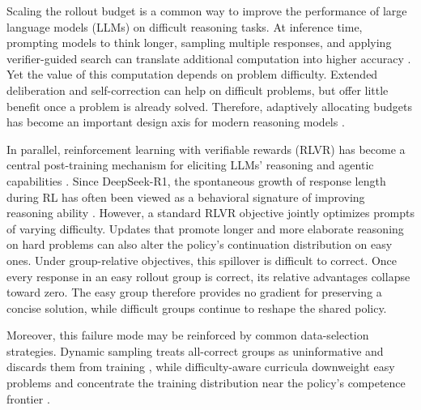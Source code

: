 \documentclass{article} %
\begin{document}
Scaling the rollout budget is a common way to improve the performance of large
language models (LLMs) on difficult reasoning tasks. At inference time,
prompting models to think longer, sampling multiple responses, and applying
verifier-guided search can translate additional computation into higher
accuracy
\citep{wei2022chain,wang2022self,lightman2024lets,snell2024scaling}.
Yet the value of this computation depends on problem difficulty. Extended
deliberation and self-correction can help on difficult problems, but offer
little benefit once a problem is already solved. Therefore, adaptively allocating budgets has become an important design axis for modern reasoning models
\citep{muennighoff2025s1,aggarwal2025l1,yang2025qwen3,
openai2025o3,anthropic2025thinking,google2025gemini}.

In parallel, reinforcement learning with verifiable rewards (RLVR) has become
a central post-training mechanism for eliciting LLMs' reasoning and agentic capabilities \citep{shao2024deepseekmath,wanbuffer,jin2025search}.
Since DeepSeek-R1\citep{guo2025deepseek}, the spontaneous growth of response length during RL has often been viewed as a behavioral signature of improving reasoning ability \citep{yeo2025demystifying}. However, a standard RLVR objective jointly optimizes prompts of varying difficulty. Updates that promote longer and more elaborate reasoning on hard problems can also alter the policy’s continuation distribution on easy ones. Under group-relative objectives, this spillover is difficult to correct. Once every response in an easy rollout group is correct, its relative advantages collapse toward zero. The easy group therefore provides no gradient for preserving a concise
solution, while difficult groups continue to reshape the shared policy. 

Moreover, this failure mode may be reinforced by common data-selection strategies.
Dynamic sampling treats all-correct
groups as uninformative and discards them from training
\citep{yu2025dapo}, while difficulty-aware curricula downweight easy problems
and concentrate the training distribution near the policy's competence
frontier
\citep{bae2026online,wanbuffer,qu2026gps}.


\end{document}
